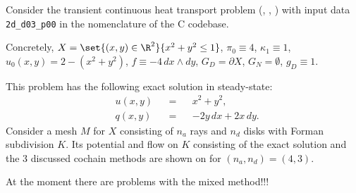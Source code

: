 \begin{example}
  Consider the transient continuous heat transport problem
  (,
   ,
   )
  with input data \verb|2d_d03_p00| in the nomenclature of the C codebase.

  Concretely,
    $X = \set{(x, y) \in \R^2}{x^2 + y^2 \leq 1}$,
    $\pi_0 \equiv 4$,
    $\kappa_1 \equiv 1$,
    $u_0(x, y) = 2 - (x^2 + y^2)$,
    $f \equiv -4\, d x \wedge d y$,
    $G_D = \partial X$,
    $G_N = \emptyset$,
    $g_D \equiv 1$.

  This problem has the following exact solution in steady-state:
  \begin{subequations}
    \begin{alignat}{3}
      & u(x, y) && = && x^2 + y^2, \\
      & q(x, y) && = && -2 y\, d x + 2 x\, d y.
    \end{alignat}
  \end{subequations}
  Consider a mesh $M$ for $X$ consisting of $n_a$ rays and $n_d$ disks
  with Forman subdivision $K$.
  Its potential and flow on $K$ consisting of the exact solution and the $3$
  discussed cochain methods are shown on
  for $(n_a, n_d) = (4, 3)$.

  {\color{red} At the moment there are problems with the mixed method!!!}
\end{example}

